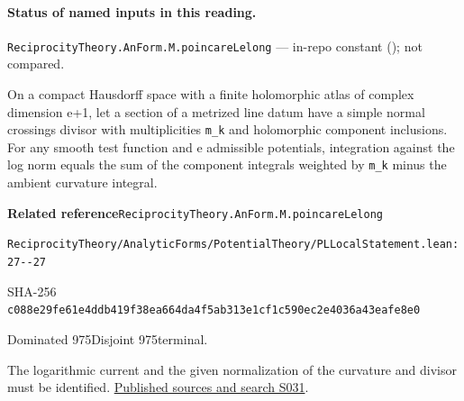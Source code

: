 

\paragraph{Status of named inputs in this reading.}
\noindent\nolinkurl{ReciprocityTheory.AnForm.M.poincareLelong} --- in-repo constant (); not compared.\par

\begin{formalstatement}[D351]\label{decomp:D351}
On a compact Hausdorff space with a finite holomorphic atlas of complex dimension e+1, let a section of a metrized line datum have a simple normal crossings divisor with multiplicities \nolinkurl{m_k} and holomorphic component inclusions. For any smooth test function and e admissible potentials, integration against the log norm equals the sum of the component integrals weighted by \nolinkurl{m_k} minus the ambient curvature integral.
\end{formalstatement}
{\small\raggedright\noindent\textsf{\bfseries Related reference}\quad \nolinkurl{ReciprocityTheory.AnForm.M.poincareLelong}\par\noindent \nolinkurl{ReciprocityTheory/AnalyticForms/PotentialTheory/PLLocalStatement.lean:27--27}\par\noindent SHA-256 \nolinkurl{c088e29fe61e4ddb419f38ea664da4f5ab313e1cf1c590ec2e4036a43eafe8e0}\par\noindent Dominated 975\quad Disjoint 975\quad terminal.\par}
The logarithmic current and the given normalization of the curvature and divisor must be identified.
\hyperref[lit:S031]{Published sources and search S031}.
